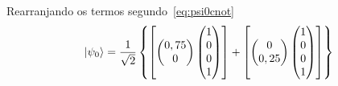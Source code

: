 Rearranjando os termos segundo~\eqref{eq:psi0cnot}
\begin{equation}
\ket{\psi_0} = \frac{1}{\sqrt{2}}\left\{\left[ \begin{pmatrix}
0,75 \\
0 
\end{pmatrix}  \begin{pmatrix}
1 \\
0 \\
0 \\
1
\end{pmatrix}\right] + \left[ \begin{pmatrix}
0 \\
0,25
\end{pmatrix}  \begin{pmatrix}
1 \\
0 \\
0 \\
1
\end{pmatrix}\right] \right\}
\end{equation}

